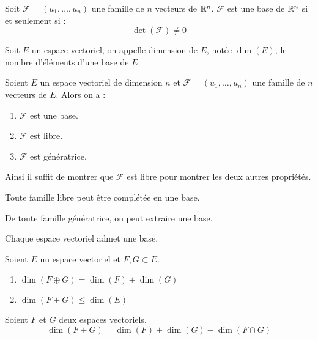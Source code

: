 \begin{proposition}
	Soit $\mathcal{F} = (u_1, \ldots, u_n)$ une famille de $n$ vecteurs de $\mathbb{R}^n$. $\mathcal{F}$ est une base de $\mathbb{R}^n$ si et seulement si :
	\[ \det(\mathcal{F}) \neq 0 \]
\end{proposition}

\begin{definition}
	Soit $E$ un espace vectoriel, on appelle dimension de $E$, notée $\dim(E)$, le nombre d'éléments d'une base de $E$. 
\end{definition}


\begin{proposition}
	Soient $E$ un espace vectoriel de dimension $n$ et $\mathcal{F} = (u_1, \ldots, u_n)$ une famille de $n$ vecteurs de $E$. Alors on a :
	\begin{multicols}{3}
	    \begin{enumerate}
		\item $\mathcal{F}$ est une base.
		\item $\mathcal{F}$ est libre.
		\item $\mathcal{F}$ est génératrice.
	\end{enumerate}
	\end{multicols}
	\noindent Ainsi il suffit de montrer que $\mathcal{F}$ est libre pour montrer les deux autres propriétés.
\end{proposition}

\begin{theorem}
	Toute famille libre peut être complétée en une base.
\end{theorem}

\begin{theorem}
    De toute famille génératrice, on peut extraire une base.
\end{theorem}

\begin{theorem}
    Chaque espace vectoriel admet une base.
\end{theorem}

\begin{proposition}
	Soient $E$ un espace vectoriel et $F, G\subset E$.
	\begin{multicols}{2}
	    \begin{enumerate}
    		\item $\dim(F \oplus G) = \dim(F) + \dim(G)$ 
    		\item $\dim(F + G) \leq \dim(E)$
    	\end{enumerate}
	\end{multicols}
\end{proposition}

\begin{theorem}
	Soient $F$ et $G$ deux espaces vectoriels.
	\[ \dim(F+G) = \dim(F) + \dim(G) - \dim(F\cap G) \]
\end{theorem}

